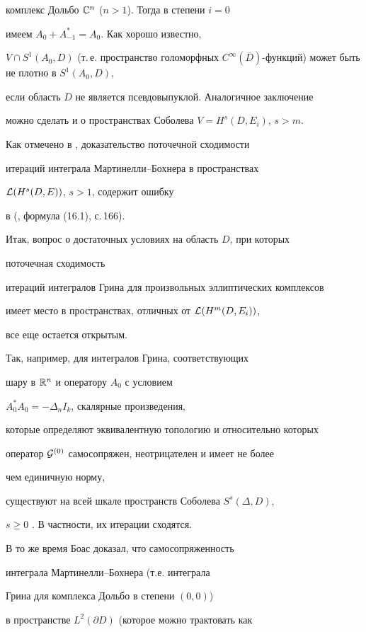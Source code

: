 комплекс Дольбо ${\Bbb C}^n$ ($n>1$). Тогда в степени $i=0$


имеем $A_0+A^*_{-1}=A_0$. Как хорошо известно,


$V \cap S ^1(A_0, D)$ (т.\,е. пространство голоморфных $C^\infty (\overline


D)$-функций) может быть не плотно в $S^1 (A_0,D)$,


если область $D$ не является псевдовыпуклой. Аналогичное заключение


можно сделать и о пространствах Соболева $V =H^s (D,E_i)$, $s>m$.


Как отмечено в \cite{Ky1}, доказательство поточечной сходимости


итераций интеграла Мартинелли--Бохнера в пространствах


${\cal L}(H^s (D,E))$, $s>1$, содержит ошибку


в (\cite{Ky}, формула (16.1), с.\,166).





Итак, вопрос о достаточных условиях на область $D$, при которых


поточечная сходимость


итераций интегралов Грина для произвольных эллиптических комплексов


имеет место в пространствах, отличных от ${\cal L}(H^{m}(D, E_i))$,


все еще остается открытым.


Так, например, для интегралов Грина, соответствующих


шару в ${\Bbb R}^n$ и оператору $A_0$ с условием


$A_0^*A_0=- \Delta_n I_k$, скалярные произведения,


которые определяют эквивалентную топологию и относительно которых


оператор ${\cal G}^{(0)}$ самосопряжен, неотрицателен и имеет не более


чем единичную норму,


существуют на всей шкале пространств Соболева $S^s (\Delta, D)$,


$s\geq 0$ \cite{Sh6}. В частности, их итерации сходятся.


В то же время Боас \cite{Ky} доказал, что самосопряженность 


интеграла Мартинелли--Бохнера (т.е. интеграла


Грина для комплекса Дольбо в степени $(0,0)$)


в пространстве $L^{2} (\partial D)$ (которое можно трактовать как


